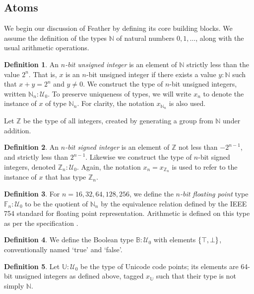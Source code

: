 \documentclass[UKenglish, 11pt, a4paper, parskip=half]{scrbook}
\theoremstyle{definition}
\newtheorem*{definition}{Definition}
\begin{document}
\subsection{Atoms}

We begin our discussion of Feather by defining its core building blocks.
We assume the definition of the types \( \mathbb N \) of natural numbers \( 0, 1, \dots \), along with the usual arithmetic operations.
\begin{definition}
    An \textit{\( n \)-bit unsigned integer} is an element of \( \mathbb N \) strictly less than the value \( 2^n \).
    That is, \( x \) is an \( n \)-bit unsigned integer if there exists a value \( y \colon \mathbb N \) such that \( x + y = 2^n \) and \( y \neq 0 \).
    We construct the type of \( n \)-bit unsigned integers, written \( \mathbb N_n \colon \mathcal U_0 \).
    To preserve uniqueness of types, we will write \( x_n \) to denote the instance of \( x \) of type \( \mathbb N_n \).
    For clarity, the notation \( x_{\mathbb N_n} \) is also used.
\end{definition}
Let \( \mathbb Z \) be the type of all integers, created by generating a group from \( \mathbb N \) under addition.
\begin{definition}
    An \textit{\( n \)-bit signed integer} is an element of \( \mathbb Z \) not less than \( -2^{n-1} \), and strictly less than \( 2^{n-1} \).
    Likewise we construct the type of \( n \)-bit signed integers, denoted \( \mathbb Z_n \colon \mathcal U_0 \).
    Again, the notation \( x_n = x_{\mathbb Z_n} \) is used to refer to the instance of \( x \) that has type \( \mathbb Z_n \).
\end{definition}
\begin{definition}
    For \( n = 16, 32, 64, 128, 256 \), we define the \textit{\( n \)-bit floating point} type \( \mathbb F_n \colon \mathcal U_0 \) to be the quotient of \( \mathbb N_n \) by the equivalence relation defined by the IEEE 754 standard for floating point representation.
    Arithmetic is defined on this type as per the specification \cite{IEEE754}.
\end{definition}
\begin{definition}
    We define the Boolean type \( \mathbb B \colon \mathcal U_0 \) with elements \( \qty{\top, \bot} \), conventionally named `true' and `false'.
\end{definition}
\begin{definition}
    Let \( \mathbb U \colon \mathcal U_0 \) be the type of Unicode code points; its elements are 64-bit unsigned integers as defined above, tagged \( x_{\mathbb U} \) such that their type is not simply \( \mathbb N \).
\end{definition}
\end{document}
